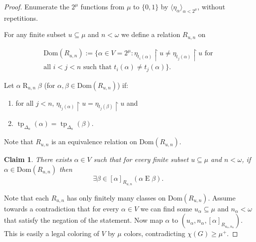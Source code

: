 \documentclass[a4paper]{amsart}
\theoremstyle{plain}
\newtheorem{claim}{Claim}[theorem]
\theoremstyle{definition}
\theoremstyle{remark}
\numberwithin{equation}{section}
\newenvironment{claimproof}[1][\proofname]
  {%
    \proof[#1]%
      \renewcommand*\qedsymbol{$\square$ (claim)}%
  }
  {%
    \endproof%
  }
\newcommand{\dom}{\mathrm{Dom}}
\newcommand{\E}{\mathrel{E}}
\newcommand{\R}{\mathrel{R}}
\DeclareMathOperator{\tp}{tp}
\begin{document}
\begin{proof}
Enumerate the $2^\mu$ functions from $\mu$ to $\{0,1\}$ by  $\langle \eta_\alpha\rangle_{\alpha<2^\mu}$, without repetitions.

For any finite subset $u\subseteq \mu$ and $n<\omega$ we define a relation $R_{u,n}$ on 

\begin{equation*}
\begin{aligned}
\dom(R_{u,n}):=\{\alpha\in V=2^\mu: \eta_{t_i(\alpha)}\restriction u\neq \eta_{t_j(\alpha)}\restriction u \text{ for}\\ \text{all $i<j<n$ such that $t_i(\alpha)\neq t_j(\alpha)$}\}. 
\end{aligned}
\end{equation*}

Let $\alpha \R_{u,n} \beta$ (for $\alpha,\beta\in \dom(R_{u,n})$) if:
\begin{enumerate}
\item for all $j<n$, $\eta_{t_j(\alpha)}\restriction u=\eta_{t_j(\beta)}\restriction u$ and
\item $\tp_{\Delta_n}(\alpha)=\tp_{\Delta_n}(\beta)$.
\end{enumerate}
Note that $R_{u,n}$ is an equivalence relation on $\dom(R_{u,n})$.

\begin{claim}\label{C:exists alpha}
There exists $\alpha\in V$ such that for every finite subset $u\subseteq  \mu$ and $n<\omega$, if $\alpha\in \dom(R_{u,n})$ then 
\[\exists \beta\in [\alpha]_{R_{u,n}} (\alpha\E\beta).\]
\end{claim}
\begin{claimproof}
Note that each $R_{u,n}$ has only finitely many classes on $\dom(R_{u,n})$. Assume towards a contradiction that for every $\alpha\in V$ we can find some $u_\alpha\subseteq \mu$ and $n_\alpha<\omega$ that satisfy the negation of the statement. Now map $\alpha$ to $(u_\alpha,n_\alpha,[\alpha]_{R_{u_\alpha,n_\alpha}})$. This is easily a legal coloring of $V$ by $\mu$ colors, contradicting $\chi(G)\geq \mu^+$.
\end{claimproof}


\end{proof}
\end{document}
